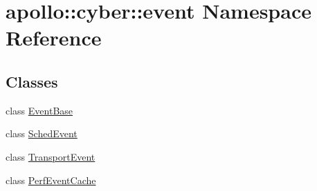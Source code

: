 \hypertarget{namespaceapollo_1_1cyber_1_1event}{\section{apollo\-:\-:cyber\-:\-:event Namespace Reference}
\label{namespaceapollo_1_1cyber_1_1event}
}
\subsection*{Classes}
\begin{DoxyCompactItemize}
\item 
class \hyperlink{classapollo_1_1cyber_1_1event_1_1EventBase}{Event\-Base}
\item 
class \hyperlink{classapollo_1_1cyber_1_1event_1_1SchedEvent}{Sched\-Event}
\item 
class \hyperlink{classapollo_1_1cyber_1_1event_1_1TransportEvent}{Transport\-Event}
\item 
class \hyperlink{classapollo_1_1cyber_1_1event_1_1PerfEventCache}{Perf\-Event\-Cache}
\end{DoxyCompactItemize}
